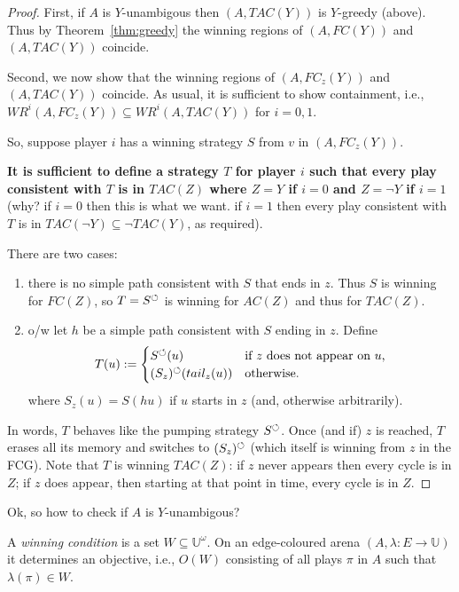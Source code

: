 \documentclass[a4paper,10pt]{article}
\begin{document}
\begin{proof}
First, if $A$ is $Y$-unambigous then $(A,TAC(Y))$ is $Y$-greedy (above). Thus by Theorem~\ref{thm:greedy} the winning regions of $(A,FC(Y))$ and $(A,TAC(Y))$ coincide.

Second, we now show that the winning regions of $(A,FC_z(Y))$ and $(A,TAC(Y))$ coincide. As usual, it is sufficient to show containment, i.e., 
$WR^i(A,FC_z(Y)) \subseteq WR^i(A,TAC(Y))$ for $i = 0,1$. 

So, suppose player $i$ has a winning strategy $S$ from $v$ in $(A,FC_z(Y))$. 

\textbf{It is sufficient to define a strategy $T$ for player $i$ such that every play consistent with $T$ is in $TAC(Z)$ where $Z = Y$ if $i = 0$ and $Z = \neg Y$ if $i=1$} (why? if $i = 0$ then this is what we want. 
if $i = 1$ then every play consistent with $T$ is in $TAC(\neg Y) \subseteq \neg TAC(Y)$, as required).

There are two cases:
\begin{enumerate}
 \item there is no simple path consistent with $S$ that ends in $z$. Thus $S$ is winning for $FC(Z)$, so $T = S^{\circlearrowleft}$ is winning for $AC(Z)$ and thus for $TAC(Z)$.
 \item o/w let $h$ be a simple path consistent with $S$ ending in $z$. Define 
\[
T(u) :=
\begin{cases}
	S^{\circlearrowleft}(u) & \mbox{if $z$ does not appear on $u$,}\\
	(S_z)^\circlearrowleft(tail_z(u)) & \mbox{otherwise.}\\
\end{cases}
\]
where 
$S_z(u) = S(hu)$ if $u$ starts in $z$ (and, otherwise arbitrarily).
 \end{enumerate}
In words, $T$ behaves like the pumping strategy $S^{\circlearrowleft}$. Once (and if) $z$ is reached, $T$ erases all its memory and switches to $(S_z)^\circlearrowleft$ (which itself is winning from $z$ in the FCG). 
Note that $T$ is winning $TAC(Z)$: if $z$ never appears then every cycle is in $Z$; if $z$ does appear, then starting at that point in time, every cycle is in $Z$.
\end{proof}

\begin{question}
Ok, so how to check if $A$ is $Y$-unambigous?
\end{question}

\begin{definition}
 A \emph{winning condition} is a set $W \subseteq \mathbb{U}^\omega$. On an edge-coloured arena $(A,\lambda:E \to \mathbb{U})$ it determines an objective, i.e., $O(W)$ consisting of all 
 plays $\pi$ in $A$ such that $\lambda(\pi) \in W$.
\end{definition}
\end{document}
